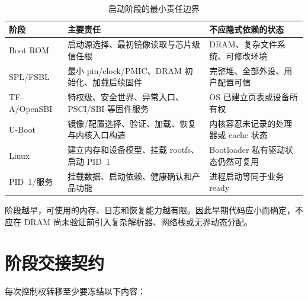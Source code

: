 \begin{center}
\end{center}

\begin{table}[H]
  \centering
  \caption{启动阶段的最小责任边界}
  \begin{tabular}{p{25mm}p{52mm}p{62mm}}
    \hline
    阶段 & 主要责任 & 不应隐式依赖的状态 \\
    \hline
    Boot ROM & 启动源选择、最初镜像读取与芯片级信任根 & DRAM、复杂文件系统、可修改环境 \\
    SPL/FSBL & 最小 pin/clock/PMIC、DRAM 初始化、加载后续固件 & 完整堆、全部外设、用户配置可信 \\
    TF-A/OpenSBI & 特权级、安全世界、异常入口、PSCI/SBI 等固件服务 & OS 已建立页表或设备所有权 \\
    U-Boot & 镜像/配置选择、验证、加载、恢复与内核入口构造 & 内核容忍未记录的处理器或 cache 状态 \\
    Linux & 建立内存和设备模型、挂载 rootfs、启动 PID~1 & Bootloader 私有驱动状态仍然可复用 \\
    PID~1/服务 & 挂载数据、启动依赖、健康确认和产品功能 & 进程启动等同于业务 ready \\
    \hline
  \end{tabular}
\end{table}

阶段越早，可使用的内存、日志和恢复能力越有限。因此早期代码应小而确定，不应在 DRAM 尚未验证前引入复杂解析器、网络栈或无界动态分配。

\section{阶段交接契约}

每次控制权转移至少要冻结以下内容：

